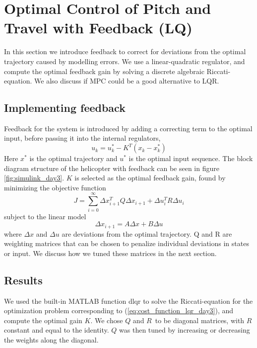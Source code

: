 \section{Optimal Control of Pitch and Travel with Feedback (LQ)}\label{sec:prob3}
In this section we introduce feedback to correct for deviations from the optimal trajectory caused by modelling errors. We use a linear-quadratic regulator, and compute the optimal feedback gain by solving a discrete algebraic Riccati-equation. We also discuss if MPC could be a good alternative to LQR.

\subsection{Implementing feedback}
Feedback for the system is introduced by adding a correcting term to the optimal input, before passing it into the internal regulators,
\begin{equation}
    u_k = u_k^* - K^T(x_k - x_k^*)
\end{equation}
Here $x^*$ is the optimal trajectory and $u^*$ is the optimal input sequence. The block diagram structure of the helicopter with feedback can be seen in figure \ref{fig:simulink_day3}. $K$ is selected as the optimal feedback gain, found by minimizing the objective function
\begin{equation}
    \label{eq:cost_function_lqr_day3}
    J = \sum_{i=0}^\infty {\Delta x_{i+1}^TQ\Delta x_{i+1} + \Delta u_{i}^TR\Delta u_{i}}
\end{equation}
subject to the linear model
\begin{equation}
    \Delta x_{i+1} = A\Delta x + B\Delta u
\end{equation}
where $\Delta x$ and $\Delta u$ are deviations from the optimal trajectory. Q and R are weighting matrices that can be chosen to penalize individual deviations in states or input. We discuss how we tuned these matrices in the next section.

\subsection{Results}

We used the built-in MATLAB function dlqr to solve the Riccati-equation for the optimization problem corresponding to (\ref{eq:cost_function_lqr_day3}), and compute the optimal gain $K$. We chose $Q$ and $R$\ to be diagonal matrices, with $R$ constant and equal to the identity. $Q$ was then tuned by increasing or decreasing the weights along the diagonal.

